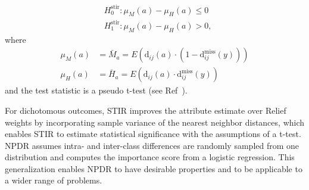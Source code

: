 \documentclass[10pt]{article}
\begin{document}

\begin{equation}
\begin{aligned}
    & H^{\text{stir}}_0: \mu_M(a) - \mu_H(a) \le 0 \\
    & H^{\text{stir}}_1: \mu_M(a) - \mu_H(a) > 0,
\end{aligned}
\end{equation}  
where
\begin{equation}
\begin{aligned}
    \mu_M(a) & = \bar{M}_a = E \left( \text{d}_{ij}(a) \cdot \left( 1-\text{d}^{\text{miss}}_{ij}(y) \right) \right) \\
    \mu_H(a) & = \bar{H}_a = E \left( \text{d}_{ij}(a) \cdot        \text{d}^{\text{miss}}_{ij}(y)           \right)
\end{aligned}
\end{equation}  
and the test statistic is a pseudo t-test (see Ref~\cite{stir}).

For dichotomous outcomes, STIR improves the attribute estimate over Relief weights by incorporating sample variance of the nearest neighbor distances, which enables STIR to estimate statistical significance with the assumptions of a t-test.
NPDR assumes intra- and inter-class differences are randomly sampled from one distribution and computes the importance score from a logistic regression.
This generalization enables NPDR to have desirable properties and to be applicable to a wider range of problems.
\end{document}
